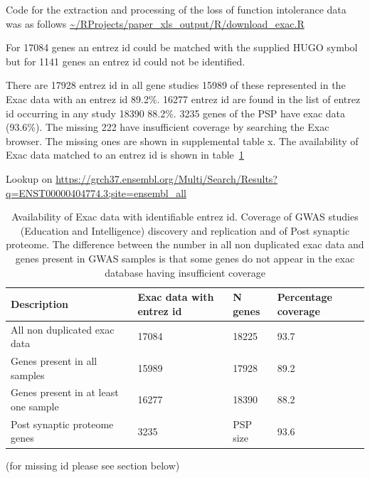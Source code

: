 Code for the extraction and processing of the loss of function intolerance data was as follows 
\url{~/RProjects/paper_xls_output/R/download_exac.R}

For 17084 genes an entrez id could be matched with the supplied HUGO symbol but for 1141 genes an entrez id could not be identified. 

There are 17928 entrez id in all gene studies
15989 of these represented in the Exac data with an entrez id
89.2\%. 16277 entrez id are found in the list of entrez id occurring in any study 18390 88.2\%. 3235 genes of the PSP have exac data (93.6\%). The missing 222 have insufficient coverage by searching the Exac browser. The missing ones are shown in supplemental table x. The availability of Exac data matched to an entrez id is shown in table~\ref{tab:exac_coverage}

Lookup on \url{https://grch37.ensembl.org/Multi/Search/Results?q=ENST00000404774.3;site=ensembl_all}

\begin{table}[]
    \centering
    \begin{tabular}{llll}
    \toprule
      Description   & Exac data with entrez id & N genes & Percentage coverage  \\
      \midrule
      All non duplicated exac data  & 17084 & 18225 & 93.7\\
       Genes present in all samples  & 15989 & 17928 & 89.2\\
       Genes present in at least one sample & 16277 & 18390 & 88.2\\
       Post synaptic proteome genes & 3235 & PSP size & 93.6\\
       \bottomrule
    \end{tabular}
    \caption{Availability of Exac data with identifiable entrez id. Coverage of GWAS studies (Education and Intelligence) discovery and replication and of Post synaptic proteome. The difference between the number in all non duplicated exac data and genes present in GWAS samples is that some genes do not appear in the exac database having insufficient coverage}
    \label{tab:exac_coverage}
\end{table}

(for missing id please see section below)





